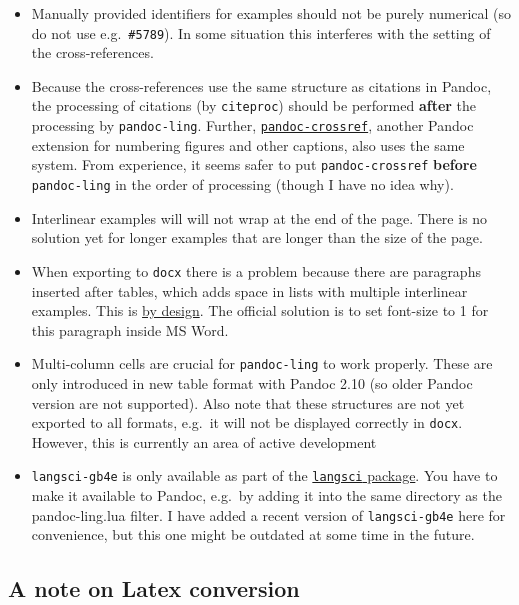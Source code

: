 \documentclass[
]{article}
\providecommand{\tightlist}{%
  \setlength{\itemsep}{0pt}\setlength{\parskip}{0pt}}
\begin{document}
\begin{itemize}
\tightlist
\item
  Manually provided identifiers for examples should not be purely
  numerical (so do not use e.g.~\texttt{\#5789}). In some situation this
  interferes with the setting of the cross-references.
\item
  Because the cross-references use the same structure as citations in
  Pandoc, the processing of citations (by \texttt{citeproc}) should be
  performed \textbf{after} the processing by \texttt{pandoc-ling}.
  Further,
  \href{https://github.com/lierdakil/pandoc-crossref}{\texttt{pandoc-crossref}},
  another Pandoc extension for numbering figures and other captions,
  also uses the same system. From experience, it seems safer to put
  \texttt{pandoc-crossref} \textbf{before} \texttt{pandoc-ling} in the
  order of processing (though I have no idea why).
\item
  Interlinear examples will will not wrap at the end of the page. There
  is no solution yet for longer examples that are longer than the size
  of the page.
\item
  When exporting to \texttt{docx} there is a problem because there are
  paragraphs inserted after tables, which adds space in lists with
  multiple interlinear examples. This is
  \href{https://answers.microsoft.com/en-us/msoffice/forum/msoffice_word-mso_windows8-mso_2013_release/how-to-remove-extra-paragraph-after-table/995b3811-9f55-4df1-bbbc-9f672b1ad262}{by
  design}. The official solution is to set font-size to 1 for this
  paragraph inside MS Word.
\item
  Multi-column cells are crucial for \texttt{pandoc-ling} to work
  properly. These are only introduced in new table format with Pandoc
  2.10 (so older Pandoc version are not supported). Also note that these
  structures are not yet exported to all formats, e.g.~it will not be
  displayed correctly in \texttt{docx}. However, this is currently an
  area of active development
\item
  \texttt{langsci-gb4e} is only available as part of the
  \href{https://ctan.org/pkg/langsci?lang=en}{\texttt{langsci} package}.
  You have to make it available to Pandoc, e.g.~by adding it into the
  same directory as the pandoc-ling.lua filter. I have added a recent
  version of \texttt{langsci-gb4e} here for convenience, but this one
  might be outdated at some time in the future.
\end{itemize}

\hypertarget{a-note-on-latex-conversion}{%
\subsection{A note on Latex
conversion}\label{a-note-on-latex-conversion}}
\end{document}
